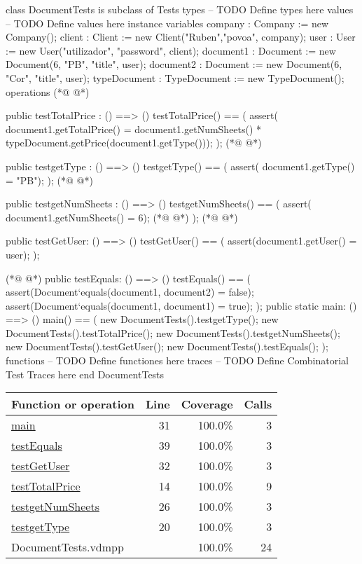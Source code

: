 \begin{vdmpp}[breaklines=true]
class DocumentTests is subclass of Tests
types
-- TODO Define types here
values
-- TODO Define values here
instance variables
company : Company := new Company();
client : Client := new Client("Ruben","povoa", company);
user : User := new User("utilizador", "password", client);
document1 : Document := new Document(6, "PB", "title", user);
document2 : Document := new Document(6, "Cor", "title", user);
typeDocument : TypeDocument := new TypeDocument();
operations
(*@
\label{testTotalPrice:14}
@*)

public testTotalPrice : () ==> ()
testTotalPrice() ==
(
 assert( document1.getTotalPrice() = document1.getNumSheets() * typeDocument.getPrice(document1.getType()));
);
(*@
\label{testgetType:20}
@*)

public testgetType : () ==> ()
testgetType() ==
(
 assert( document1.getType() = "PB");
);
(*@
\label{testgetNumSheets:26}
@*)

public testgetNumSheets : () ==> ()
testgetNumSheets() ==
(
 assert( document1.getNumSheets() = 6);
(*@
\label{main:31}
@*)
);
(*@
\label{testGetUser:32}
@*)

public testGetUser: () ==> ()
testGetUser() ==
(
assert(document1.getUser() = user);
);

(*@
\label{testEquals:39}
@*)
public testEquals: () ==> ()
testEquals() ==
(
assert(Document`equals(document1, document2) = false);
assert(Document`equals(document1, document1) = true);
);
public static main: () ==> ()
 main() ==
 (
  new DocumentTests().testgetType();
  new DocumentTests().testTotalPrice();
  new DocumentTests().testgetNumSheets();
  new DocumentTests().testGetUser();
  new DocumentTests().testEquals();
 );
functions
-- TODO Define functiones here
traces
-- TODO Define Combinatorial Test Traces here
end DocumentTests
\end{vdmpp}
\bigskip
\begin{longtable}{|l|r|r|r|}
\hline
Function or operation & Line & Coverage & Calls \\
\hline
\hline
\hyperref[main:31]{main} & 31&100.0\% & 3 \\
\hline
\hyperref[testEquals:39]{testEquals} & 39&100.0\% & 3 \\
\hline
\hyperref[testGetUser:32]{testGetUser} & 32&100.0\% & 3 \\
\hline
\hyperref[testTotalPrice:14]{testTotalPrice} & 14&100.0\% & 9 \\
\hline
\hyperref[testgetNumSheets:26]{testgetNumSheets} & 26&100.0\% & 3 \\
\hline
\hyperref[testgetType:20]{testgetType} & 20&100.0\% & 3 \\
\hline
\hline
DocumentTests.vdmpp & & 100.0\% & 24 \\
\hline
\end{longtable}

